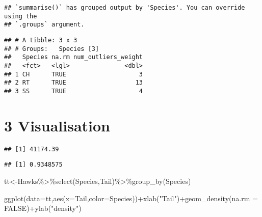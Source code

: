 \documentclass[
]{article}
\newenvironment{Shaded}{\begin{snugshade}}{\end{snugshade}}
\newcommand{\AttributeTok}[1]{\textcolor[rgb]{0.77,0.63,0.00}{#1}}
\newcommand{\ConstantTok}[1]{\textcolor[rgb]{0.00,0.00,0.00}{#1}}
\newcommand{\FunctionTok}[1]{\textcolor[rgb]{0.00,0.00,0.00}{#1}}
\newcommand{\NormalTok}[1]{#1}
\newcommand{\OtherTok}[1]{\textcolor[rgb]{0.56,0.35,0.01}{#1}}
\newcommand{\SpecialCharTok}[1]{\textcolor[rgb]{0.00,0.00,0.00}{#1}}
\newcommand{\StringTok}[1]{\textcolor[rgb]{0.31,0.60,0.02}{#1}}
\begin{document}
\begin{verbatim}
## `summarise()` has grouped output by 'Species'. You can override using the
## `.groups` argument.
\end{verbatim}

\begin{verbatim}
## # A tibble: 3 x 3
## # Groups:   Species [3]
##   Species na.rm num_outliers_weight
##   <fct>   <lgl>               <dbl>
## 1 CH      TRUE                    3
## 2 RT      TRUE                   13
## 3 SS      TRUE                    4
\end{verbatim}

\hypertarget{visualisation}{%
\section{3 Visualisation}\label{visualisation}}

\begin{Shaded}
\end{Shaded}

\begin{verbatim}
## [1] 41174.39
\end{verbatim}

\begin{Shaded}
\end{Shaded}

\begin{verbatim}
## [1] 0.9348575
\end{verbatim}

\begin{Shaded}
\begin{Highlighting}[]
\NormalTok{tt}\OtherTok{\textless{}{-}}\NormalTok{Hawks}\SpecialCharTok{\%\textgreater{}\%}\FunctionTok{select}\NormalTok{(Species,Tail)}\SpecialCharTok{\%\textgreater{}\%}\FunctionTok{group\_by}\NormalTok{(Species)}

\FunctionTok{ggplot}\NormalTok{(}\AttributeTok{data=}\NormalTok{tt,}\FunctionTok{aes}\NormalTok{(}\AttributeTok{x=}\NormalTok{Tail,}\AttributeTok{color=}\NormalTok{Species))}\SpecialCharTok{+}\FunctionTok{xlab}\NormalTok{(}\StringTok{"Tail"}\NormalTok{)}\SpecialCharTok{+}\FunctionTok{geom\_density}\NormalTok{(}\AttributeTok{na.rm =} \ConstantTok{FALSE}\NormalTok{)}\SpecialCharTok{+}\FunctionTok{ylab}\NormalTok{(}\StringTok{"density"}\NormalTok{)}
\end{Highlighting}
\end{Shaded}
\end{document}
